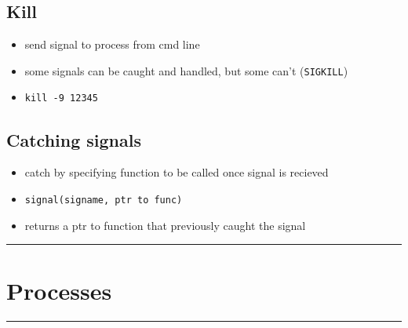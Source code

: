 \documentclass[10pt, multicolumn, a4paper]{article}
\begin{document}
\begin{multicols}{2}
	\subsection*{Kill}
	\begin{itemize}
	\item send signal to process from cmd line
	\item some signals can be caught and handled, but some can't (\verb|SIGKILL|)
	\item \verb|kill -9 12345|
	\end{itemize}
	\subsection*{Catching signals}
	\begin{itemize}
	\item catch by specifying function to be called once signal is recieved
	\item \verb|signal(signame, ptr to func)|
	\item returns a ptr to function that previously caught the signal
	\end{itemize}
\end{multicols}

\setcounter{section}{9}
\hrule
\section{Processes}
\hrule 
\end{document}
